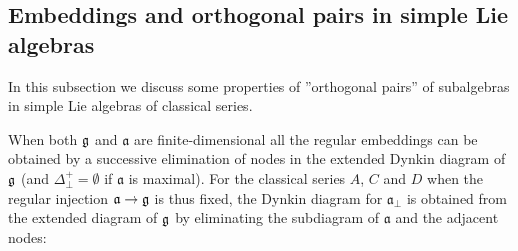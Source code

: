 \documentclass[12pt]{iopart}
\theoremstyle{definition}
\newcommand{\af}{\mathfrak{a}}
\begin{document}
\subsection{Embeddings and orthogonal pairs in simple Lie algebras}
\label{sect-embeddings}

In this subsection we discuss some properties of ''orthogonal pairs'' of
subalgebras in simple Lie algebras of classical series.

When both $\frak{g}$ and $\af$ are finite-dimensional all the regular
embeddings can be obtained by a successive elimination of nodes in the
extended Dynkin diagram of $\frak{g}$ (and $\Delta _{\bot }^{+}=\emptyset $
if $\af$ is maximal). For the classical series $A$, $C$ and $D$ when
the regular injection $\af\rightarrow \frak{g}$ is thus fixed, the
Dynkin diagram for $\af_{\bot }$ is obtained from the extended diagram
of $\frak{g}$ by eliminating the subdiagram of $\af$ and the adjacent
nodes:
\end{document}
